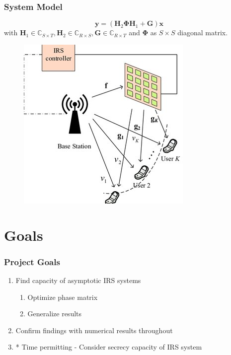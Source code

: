 \documentclass[10pt,tgadventor, onlymath]{beamer}
\begin{document}
\begin{frame}
\frametitle{System Model}
\centering
\begin{equation}
	\mathbf{y} = (\mathbf{H}_2\boldsymbol{\Phi}\mathbf{H}_1 + \mathbf{G})\mathbf{x}
\end{equation}
with 
$\mathbf{H}_{1}\in \mathbb{C}_{S \times T},\mathbf{H}_{2} \in \mathbb{C}_{R \times S}, \mathbf{G} \in \mathbb{C}_{R \times T}$ and $\boldsymbol{\Phi}$ as $S \times S$ diagonal matrix.

	\begin{figure}
		\centering
		\includegraphics[scale=1]{irs}
	\end{figure}
\end{frame}

\section{Goals}
\begin{frame}
\frametitle{Project Goals}
\begin{enumerate}
\item
	Find capacity of asymptotic IRS systems
	\begin{enumerate}
	\item 
		Optimize phase matrix
	\item
		Generalize results
	\end{enumerate}

\item 
	Confirm findings with numerical results throughout
	
\item
	* Time permitting - Consider secrecy capacity of IRS system
\end{enumerate}
\end{frame}
\end{document}
